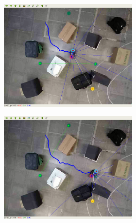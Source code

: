 \begin{figure}[H]
\begin{center}
\begin{subfigure}[b]{0.60\textwidth}
\begin{subfigure}[b]{0.24\textwidth}
        \end{subfigure}
        \hfill
        \begin{subfigure}[b]{0.24\textwidth}
            \includegraphics[width=\textwidth]{imagens/real_envs/real_env2_ddpg/3.png}
        \end{subfigure}
        \hfill
        \begin{subfigure}[b]{0.24\textwidth}
            \includegraphics[width=\textwidth]{imagens/real_envs/real_env2_ddpg/4.png}
        \end{subfigure}
        

\end{subfigure}
\end{center}
\end{figure}
